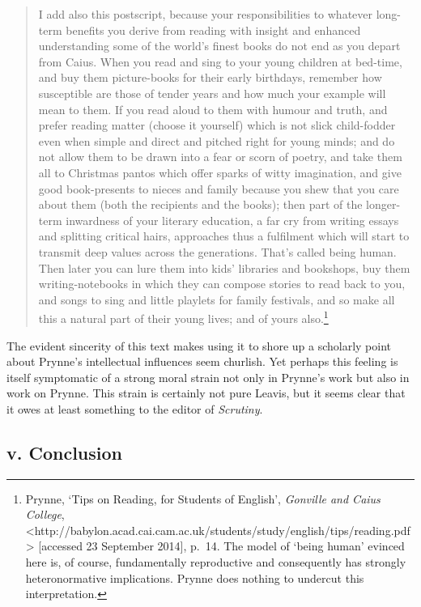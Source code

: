 \documentclass[]{article}
\begin{document}
\begin{quote}
I add also this postscript, because your responsibilities to whatever
long-term benefits you derive from reading with insight and enhanced
understanding some of the world's finest books do not end as you depart
from Caius. When you read and sing to your young children at bed-time,
and buy them picture-books for their early birthdays, remember how
susceptible are those of tender years and how much your example will
mean to them. If you read aloud to them with humour and truth, and
prefer reading matter (choose it yourself) which is not slick
child-fodder even when simple and direct and pitched right for young
minds; and do not allow them to be drawn into a fear or scorn of poetry,
and take them all to Christmas pantos which offer sparks of witty
imagination, and give good book-presents to nieces and family because
you shew that you care about them (both the recipients and the books);
then part of the longer-term inwardness of your literary education, a
far cry from writing essays and splitting critical hairs, approaches
thus a fulfilment which will start to transmit deep values across the
generations. That's called being human. Then later you can lure them
into kids' libraries and bookshops, buy them writing-notebooks in which
they can compose stories to read back to you, and songs to sing and
little playlets for family festivals, and so make all this a natural
part of their young lives; and of yours also.\footnote{Prynne, `Tips on
  Reading, for Students of English', \emph{Gonville and Caius College},
  \textless{}http://babylon.acad.cai.cam.ac.uk/students/study/english/tips/reading.pdf\textgreater{}
  {[}accessed 23 September 2014{]}, p.~14. The model of `being human'
  evinced here is, of course, fundamentally reproductive and
  consequently has strongly heteronormative implications. Prynne does
  nothing to undercut this interpretation.}
\end{quote}

\noindent The evident sincerity of this text makes using it to shore up
a scholarly point about Prynne's intellectual influences seem churlish.
Yet perhaps this feeling is itself symptomatic of a strong moral strain
not only in Prynne's work but also in work on Prynne. This strain is
certainly not pure Leavis, but it seems clear that it owes at least
something to the editor of \emph{Scrutiny}.

\subsection{v. Conclusion}\label{v.-conclusion}
\end{document}

